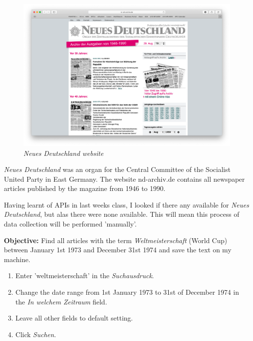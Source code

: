 \documentclass{article}
\begin{document}
\begin{figure}[h]
    \centering
    \includegraphics[width=\textwidth]{nd.png}
    \caption{\textit{Neues Deutschland website}}
    \label{fig:my_label}
\end{figure}


\textit{Neues Deutschland} was an organ for the Central Committee of the Socialist United Party in East Germany. The website nd-archiv.de contains all newspaper articles published by the magazine from 1946 to 1990.

Having learnt of APIs in last weeks class, I looked if there any available for \textit{Neues Deutschland}, but alas there were none available. This will mean this process of data collection will be performed 'manually'. 

\textbf{Objective:} Find all articles with the term \textit{Weltmeisterschaft} (World Cup) between January 1st 1973 and December 31st 1974 and save the text on my machine.

\begin{enumerate}
    \item Enter 'weltmeisterschaft' in the \textit{Suchausdruck}.
    \item Change the date range from 1st January 1973 to 31st of December 1974 in the \textit{In welchem Zeitraum} field.
    \item Leave all other fields to default setting.
    \item Click \textit{Suchen}.
\end{enumerate}
\end{document}
